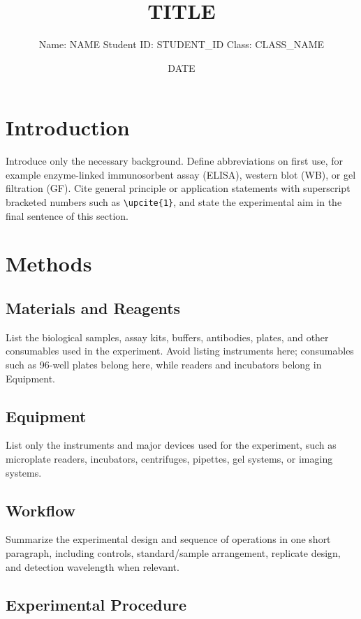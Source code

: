 \documentclass[lang={{LANG}},a4paper,11pt]{elegantpaper}
\title{{{TITLE}}}
\author{Name: {{NAME}} \quad Student ID: {{STUDENT_ID}} \quad Class: {{CLASS_NAME}}}
\date{{{DATE}}}
\newcommand{\upcite}[1]{\allowbreak\textsuperscript{\normalfont[#1]}}
\begin{document}
\maketitle
\vspace{-0.8em}

\section{Introduction}

Introduce only the necessary background. Define abbreviations on first use, for example enzyme-linked immunosorbent assay (ELISA), western blot (WB), or gel filtration (GF). Cite general principle or application statements with superscript bracketed numbers such as \verb|\upcite{1}|, and state the experimental aim in the final sentence of this section.

\section{Methods}

\subsection{Materials and Reagents}

List the biological samples, assay kits, buffers, antibodies, plates, and other consumables used in the experiment. Avoid listing instruments here; consumables such as 96-well plates belong here, while readers and incubators belong in Equipment.

\subsection{Equipment}

List only the instruments and major devices used for the experiment, such as microplate readers, incubators, centrifuges, pipettes, gel systems, or imaging systems.

\subsection{Workflow}

Summarize the experimental design and sequence of operations in one short paragraph, including controls, standard/sample arrangement, replicate design, and detection wavelength when relevant.

\subsection{Experimental Procedure}
\end{document}
